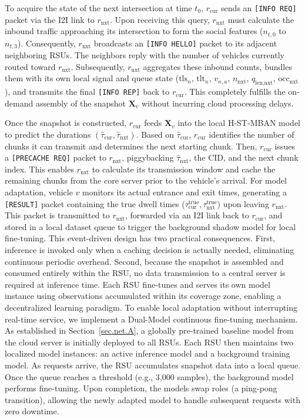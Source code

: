 \documentclass[journal]{IEEEtran}
\begin{document}
To acquire the state of the next intersection at time $t_0$, $r_{\text{cur}}$ sends an \texttt{[INFO REQ]} packet via the I2I link to $r_{\text{nxt}}$.
Upon receiving this query, $r_{\text{nxt}}$ must calculate the inbound traffic approaching its intersection to form the social features ($n_{t,0}$ to $n_{t,3}$).
Consequently, $r_{\text{nxt}}$ broadcasts an \texttt{[INFO HELLO]} packet to its adjacent neighboring RSUs.
The neighbors reply with the number of vehicles currently routed toward $r_{\text{nxt}}$.
Subsequently, $r_{\text{nxt}}$ aggregates these inbound counts, bundles them with its own local signal and queue state ($\text{tls}_n$, $\text{tlt}_n$, $v_{n,a}$, $n_{\text{nxt}}$, $q_{\text{len,nxt}}$, $\text{occ}_{\text{nxt}}$), and transmits the final \texttt{[INFO REP]} back to $r_{\text{cur}}$.
This completely fulfills the on-demand assembly of the snapshot $\mathbf{X}_v$ without incurring cloud processing delays.

Once the snapshot is constructed, $r_{\text{cur}}$ feeds $\mathbf{X}_v$ into the local H-ST-MBAN model to predict the durations $(\hat{\tau}_{\text{cur}}, \hat{\tau}_{\text{nxt}})$.
Based on $\hat{\tau}_{\text{cur}}$, $r_{\text{cur}}$ identifies the number of chunks it can transmit and determines the next starting chunk.
Then, $r_{\text{cur}}$ issues a \texttt{[PRECACHE REQ]} packet to $r_{\text{nxt}}$, piggybacking $\hat{\tau}_{\text{nxt}}$, the CID, and the next chunk index.
This enables $r_{\text{nxt}}$ to calculate its transmission window and cache the remaining chunks from the core server prior to the vehicle's arrival.
For model adaptation, vehicle $v$ monitors its actual entrance and exit times, generating a \texttt{[RESULT]} packet containing the true dwell times ($\tau_{\text{cur}}^{\text{true}}, \tau_{\text{nxt}}^{\text{true}}$) upon leaving $r_{\text{nxt}}$.
This packet is transmitted to $r_{\text{nxt}}$, forwarded via an I2I link back to $r_{\text{cur}}$, and stored in a local dataset queue to trigger the background shadow model for local fine-tuning.
This event-driven design has two practical consequences.
First, inference is invoked only when a caching decision is actually needed,
eliminating continuous periodic overhead.
Second, because the snapshot is assembled and consumed entirely within the RSU,
no data transmission to a central server is required at inference time.
Each RSU fine-tunes and serves its own model instance using observations accumulated
within its coverage zone, enabling a decentralized learning paradigm.
To enable local adaptation without interrupting real-time service, we implement a Dual-Model continuous fine-tuning mechanism.
As established in Section~\ref{sec.net.A}, a globally pre-trained baseline model from the cloud server is initially deployed to all RSUs.
Each RSU then maintains two localized model instances: an active inference model and a background training model.
As requests arrive, the RSU accumulates snapshot data into a local queue.
Once the queue reaches a threshold (e.g., 3,000 samples), the background model performs fine-tuning.
Upon completion, the models swap roles (a ping-pong transition), allowing the newly adapted model to handle
subsequent requests with zero downtime.
\end{document}
